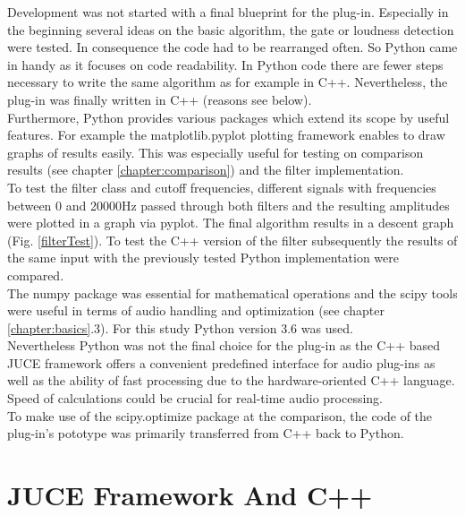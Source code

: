 Development was not started with a final blueprint for the plug-in. Especially in the beginning several ideas on the basic algorithm, the gate or loudness detection were tested. In consequence the code had to be rearranged often. So Python came in handy as it focuses on code readability. In Python code there are fewer steps necessary to write the same algorithm as for example in C++. Nevertheless, the plug-in was finally written in C++ (reasons see below).\\
Furthermore, Python provides various packages which extend its scope by useful features. For example the matplotlib.pyplot\cite{MPlot} plotting framework enables to draw graphs of results easily. This was especially useful for testing on comparison results (see chapter \ref{chapter:comparison}) and the filter implementation.\\
To test the filter class and cutoff frequencies, different signals with frequencies between 0 and 20000Hz passed through both filters and the resulting amplitudes were plotted in a graph via pyplot. The final algorithm results in a descent graph (Fig. \ref{filterTest}). To test the C++ version of the filter subsequently the results of the same input with the previously tested Python implementation were compared.\\
The numpy\cite{numpy} package was essential for mathematical operations and the scipy\cite{scipy} tools were useful in terms of audio handling and optimization (see chapter \ref{chapter:basics}.3). For this study Python version 3.6 was used.\\
Nevertheless Python was not the final choice for the plug-in as the C++ based JUCE framework offers a convenient predefined interface for audio plug-ins as well as the ability of fast processing due to the hardware-oriented C++ language. Speed of calculations could be crucial for real-time audio processing.\\
To make use of the scipy.optimize package at the comparison, the code of the plug-in's pototype was primarily transferred from C++ back to Python.\\

\section{JUCE Framework And C++}

